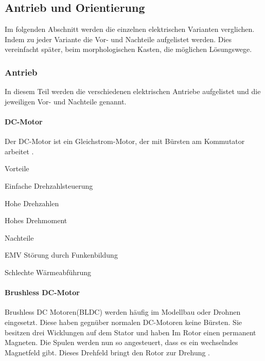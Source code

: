 \documentclass[../main.tex]{subfiles}
\begin{document}
\subsection{Antrieb und Orientierung}
Im folgenden Abschnitt werden die einzelnen elektrischen Varianten verglichen. Indem zu jeder Variante die Vor- und Nachteile aufgelistet werden. Dies vereinfacht später, beim morphologischen Kasten, die möglichen Lösungswege.

\subsubsection{Antrieb}

In diesem Teil werden die verschiedenen elektrischen Antriebe aufgelistet und die jeweiligen Vor- und Nachteile genannt. 

\paragraph{DC-Motor}

Der DC-Motor ist ein Gleichstrom-Motor, der mit Bürsten am Kommutator arbeitet \cite{dc_motor}. 

\begin{minipage}[t]{0.48\textwidth}
\begin{items}
  \item [Vorteile]
  \item Einfache Drehzahlsteuerung
  \item Hohe Drehzahlen
  \item Hohes Drehmoment
\end{items}
\end{minipage}
\hfill
\begin{minipage}[t]{0.48\textwidth}
\begin{items}
  \item [Nachteile]
  \item EMV Störung durch Funkenbildung
  \item Schlechte Wärmeabführung
\end{items}
\end{minipage}

\paragraph{Brushless DC-Motor}

Brushless DC Motoren(BLDC) werden häufig im Modellbau oder Drohnen eingesetzt. Diese haben gegnüber normalen DC-Motoren keine Bürsten. Sie besitzen drei Wicklungen auf dem Stator und haben Im Rotor einen permanent Magneten. Die Spulen werden nun so angesteuert, dass es ein wechselndes Magnetfeld gibt. Dieses Drehfeld bringt den Rotor zur Drehung \cite{brushless}. 
\end{document}
